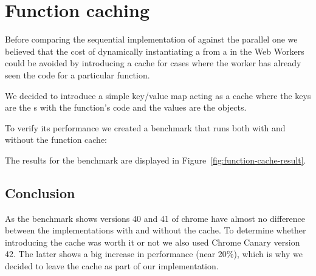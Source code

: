 \section{Function caching}

Before comparing the sequential implementation of  against the parallel one we believed that the cost of dynamically instantiating a \tfunction{} from a \tstring{} in the Web Workers could be avoided by introducing a cache for cases where the worker has already seen the code for a particular function.

We decided to introduce a simple key/value map acting as a cache where the keys are the \tstring{}s with the function's code and the values are the \tfunction{} objects.

To verify its performance we created a benchmark that runs both with and without the function cache:

The results for the benchmark are displayed in Figure~\ref{fig:function-cache-result}.

\subsection{Conclusion}
As the benchmark shows versions 40 and 41 of chrome have almost no difference between the implementations with and without the cache. To determine whether introducing the cache was worth it or not we also used Chrome Canary version 42. The latter shows a big increase in performance (near 20\%), which is why we decided to leave the \tfunction{} cache as part of our implementation.

\pagebreak